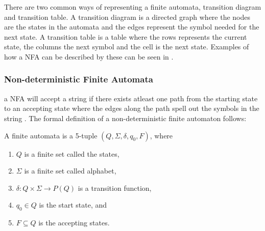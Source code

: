 There are two common ways of representing a finite automata, transition diagram
and transition table. A transition diagram is a directed graph where the nodes
are the states in the automata and the edges represent the symbol needed for the
next state. A transition table is a table where the rows represents the current
state, the columns the next symbol and the cell is the next state. Examples of
how a NFA can be described by these can be seen in \label{regexp2td}
\cite{Aho2006}.

\subsubsection{Non-deterministic Finite Automata}
a NFA will accept a string if there exists atleast one path from the starting
state to an accepting state where the edges along the path spell out the symbols
in the string \cite{Aho2006}.
The formal definition of a non-deterministic finite automaton follows:
\newpage
\begin{definition} \label{finiteAutomataDef}
A finite automata is a 5-tuple $(Q, \Sigma, \delta, q_0, F)$, where
\begin{enumerate}
  \item $Q$ is a finite set called the states,
  \item $\Sigma$ is a finite set called alphabet,
  \item $\delta: Q \times \Sigma \to P(Q)$ is a transition function,
  \item $q_0 \in Q$ is the start state, and
  \item $F \subseteq Q$ is the accepting states.
\end{enumerate} 
\end{definition}

